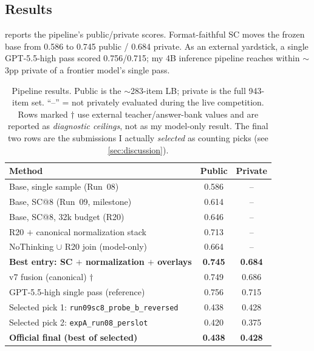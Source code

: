 \documentclass{article}
\begin{document}
\subsection{Results}
\label{sec:results}
 reports the pipeline's public/private scores. Format-faithful SC
moves the frozen base from 0.586 to 0.745 public / 0.684 private. As an external yardstick, a single GPT-5.5-high pass scored 0.756/0.715; my 4B
inference pipeline reaches within $\sim$3pp private of a frontier model's single pass.

\begin{table}[h]
  \caption{Pipeline results. Public is the $\sim$283-item LB; private is the full
  943-item set. ``--'' = not privately evaluated during the live competition. Rows
  marked $\dagger$ use external teacher/answer-bank values and are reported as
  \emph{diagnostic ceilings}, not as my model-only result. The final two rows are the
  submissions I actually \emph{selected} as counting picks (see \cref{sec:discussion}).}
  \label{tab:results}
  \centering
  \begin{tabular}{lcc}
    \toprule
    Method & Public & Private \\
    \midrule
    Base, single sample (Run~08)                       & 0.586 & -- \\
    Base, SC@8 (Run~09, milestone)                      & 0.614 & -- \\
    Base, SC@8, 32k budget (R20)                        & 0.646 & -- \\
    R20 $+$ canonical normalization stack               & 0.713 & -- \\
    NoThinking $\cup$ R20 join (model-only)             & 0.664 & -- \\
    \textbf{Best entry: SC $+$ normalization $+$ overlays} & \textbf{0.745} & \textbf{0.684} \\
    \midrule
    v7 fusion (canonical) $\dagger$                     & 0.749 & 0.686 \\
    GPT-5.5-high single pass (reference)                & 0.756 & 0.715 \\
    \midrule
    Selected pick 1: \texttt{run09sc8\_probe\_b\_reversed} & 0.438 & 0.428 \\
    Selected pick 2: \texttt{expA\_run08\_perslot}         & 0.420 & 0.375 \\
    \textbf{Official final (best of selected)}             & \textbf{0.438} & \textbf{0.428} \\
    \bottomrule
  \end{tabular}
\end{table}
\end{document}
